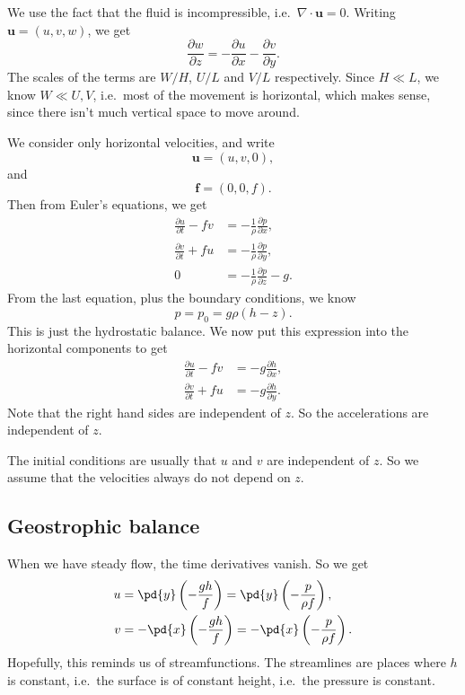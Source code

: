 \documentclass[a4paper]{article}
\begin{document}
We use the fact that the fluid is incompressible, i.e.\ $\nabla \cdot \mathbf{u} = 0$. Writing $\mathbf{u} = (u, v, w)$, we get
\[
  \frac{\partial w}{\partial z} = -\frac{\partial u}{\partial x} - \frac{\partial v}{\partial y}.
\]
The scales of the terms are $W/H$, $U/L$ and $V/L$ respectively. Since $H \ll L$, we know $W \ll U, V$, i.e.\ most of the movement is horizontal, which makes sense, since there isn't much vertical space to move around.

We consider only horizontal velocities, and write
\[
  \mathbf{u} = (u, v, 0),
\]
and
\[
  \mathbf{f} = (0, 0, f).
\]
Then from Euler's equations, we get
\begin{align*}
  \frac{\partial u}{\partial t} - fv &= -\frac{1}{\rho} \frac{\partial p}{\partial x},\\
  \frac{\partial v}{\partial t} + fu &= -\frac{1}{\rho} \frac{\partial p}{\partial y},\\
  0 &= -\frac{1}{\rho}\frac{\partial p}{\partial z} -g.
\end{align*}
From the last equation, plus the boundary conditions, we know
\[
  p = p_0 = g\rho(h - z).
\]
This is just the hydrostatic balance. We now put this expression into the horizontal components to get
\begin{align*}
  \frac{\partial u}{\partial t} - fv &= -g\frac{\partial h}{\partial x},\\
  \frac{\partial v}{\partial t} + fu &= -g\frac{\partial h}{\partial y}.
\end{align*}
Note that the right hand sides are independent of $z$. So the accelerations are independent of $z$.

The initial conditions are usually that $u$ and $v$ are independent of $z$. So we assume that the velocities always do not depend on $z$.

\subsection{Geostrophic balance}
When we have steady flow, the time derivatives vanish. So we get
\begin{align*}
  u &= \pd{y} \left(-\frac{gh}{f}\right) = \pd{y} \left(-\frac{p}{\rho f}\right),\\
  v &= -\pd{x} \left(-\frac{gh}{f}\right) = -\pd{x} \left(-\frac{p}{\rho f}\right).
\end{align*}
Hopefully, this reminds us of streamfunctions. The streamlines are places where $h$ is constant, i.e.\ the surface is of constant height, i.e.\ the pressure is constant.
\end{document}
